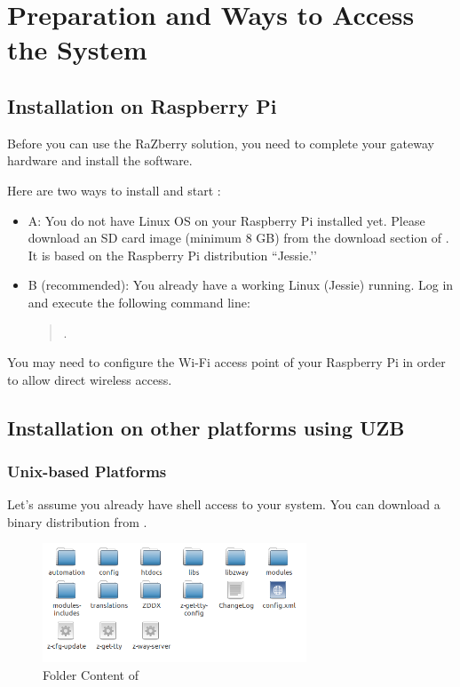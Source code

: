 \chapter{Preparation and Ways to Access the  System}

\section {Installation on Raspberry Pi}

Before you can use the RaZberry solution, you need to complete your gateway hardware 
and install the software.

Here are two ways to install and start \zway:

\begin{itemize}
\item A:  You do not have Linux OS on your Raspberry Pi installed yet. Please download 
an SD card image (minimum 8 GB) from the download section of 
. It is based on the Raspberry Pi distribution ``Jessie.’’

\item B (recommended): You already have a working Linux (Jessie) running. Log in and 
execute the following command line:

\begin{quote}
.
\end{quote}

\end{itemize}

You may need to configure the Wi-Fi access point of your Raspberry Pi in order to allow 
direct wireless access.

\section {Installation on other platforms using UZB}

\subsection {Unix-based Platforms}

Let’s assume you already have shell access to your system. You can download a binary 
distribution from .

\begin{figure}
\begin{center}
\includegraphics[width=0.7\textwidth]{pngs/cap3/rootfolder.png}
\caption{Folder Content of \zway}
\label{rootfile}
\end{center}
\end{figure}

